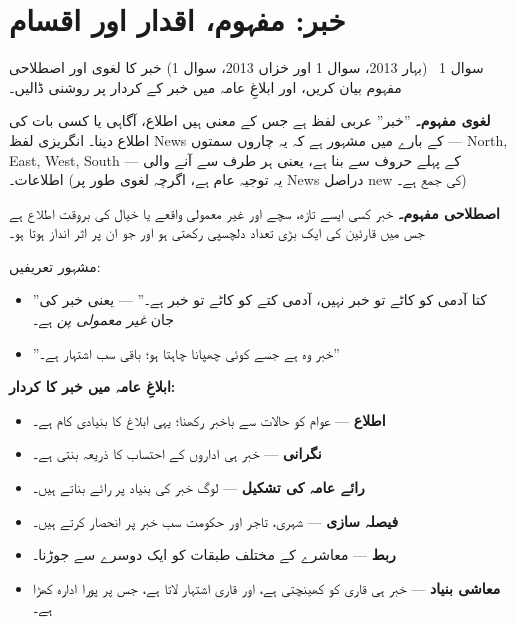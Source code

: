 
\section*{خبر: مفہوم، اقدار اور اقسام}

\begin{sawal}{سوال \textenglish{1} \ \textnormal{\small(بہار \textenglish{2013}، سوال \textenglish{1} اور خزاں \textenglish{2013}، سوال \textenglish{1})}}
خبر کا لغوی اور اصطلاحی مفہوم بیان کریں، اور ابلاغِ عامہ میں خبر کے کردار پر
روشنی ڈالیں۔
\end{sawal}

\begin{hal}
\textbf{لغوی مفہوم۔} ''خبر'' عربی لفظ ہے جس کے معنی ہیں اطلاع، آگاہی یا کسی
بات کی اطلاع دینا۔ انگریزی لفظ \textenglish{News} کے بارے میں مشہور ہے کہ یہ
چاروں سمتوں --- \textenglish{North, East, West, South} --- کے پہلے حروف سے بنا
ہے، یعنی ہر طرف سے آنے والی اطلاعات۔ (یہ توجیہ عام ہے، اگرچہ لغوی طور پر
\textenglish{News} دراصل \textenglish{new} کی جمع ہے۔)

\medskip
\textbf{اصطلاحی مفہوم۔} خبر کسی ایسے تازہ، سچے اور غیر معمولی واقعے یا خیال کی
بروقت اطلاع ہے جس میں قارئین کی ایک بڑی تعداد دلچسپی رکھتی ہو اور جو ان پر اثر
انداز ہوتا ہو۔

\smallskip
مشہور تعریفیں:
\begin{itemize}\setlength{\itemsep}{1pt}
  \item ''کتا آدمی کو کاٹے تو خبر نہیں، آدمی کتے کو کاٹے تو خبر ہے۔'' ---
        یعنی خبر کی جان \emph{غیر معمولی پن} ہے۔
  \item ''خبر وہ ہے جسے کوئی چھپانا چاہتا ہو؛ باقی سب اشتہار ہے۔''
\end{itemize}

\medskip
\textbf{ابلاغِ عامہ میں خبر کا کردار:}
\begin{itemize}\setlength{\itemsep}{1pt}
  \item \textbf{اطلاع} --- عوام کو حالات سے باخبر رکھنا؛ یہی ابلاغ کا بنیادی
        کام ہے۔
  \item \textbf{نگرانی} --- خبر ہی اداروں کے احتساب کا ذریعہ بنتی ہے۔
  \item \textbf{رائے عامہ کی تشکیل} --- لوگ خبر کی بنیاد پر رائے بناتے ہیں۔
  \item \textbf{فیصلہ سازی} --- شہری، تاجر اور حکومت سب خبر پر انحصار کرتے ہیں۔
  \item \textbf{ربط} --- معاشرے کے مختلف طبقات کو ایک دوسرے سے جوڑنا۔
  \item \textbf{معاشی بنیاد} --- خبر ہی قاری کو کھینچتی ہے، اور قاری اشتہار
        لاتا ہے، جس پر پورا ادارہ کھڑا ہے۔
\end{itemize}

\end{hal}

